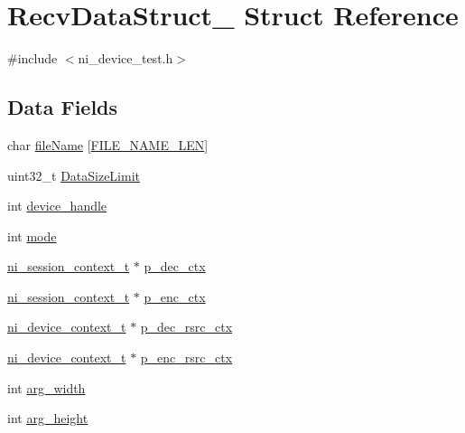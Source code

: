 \hypertarget{struct_recv_data_struct__}{}\section{Recv\+Data\+Struct\+\_\+ Struct Reference}
\label{struct_recv_data_struct__}


{\ttfamily \#include $<$ni\+\_\+device\+\_\+test.\+h$>$}

\subsection*{Data Fields}
\begin{DoxyCompactItemize}
\item 
char \mbox{\hyperlink{struct_recv_data_struct___a1d89f9668c6a633415048f1557a27122}{file\+Name}} \mbox{[}\mbox{\hyperlink{ni__device__test_8h_afddfc0468a0fb0d80c116b5e16b9be17}{F\+I\+L\+E\+\_\+\+N\+A\+M\+E\+\_\+\+L\+EN}}\mbox{]}
\item 
uint32\+\_\+t \mbox{\hyperlink{struct_recv_data_struct___a4aa53b9be31c92ae0c808987161f96d3}{Data\+Size\+Limit}}
\item 
int \mbox{\hyperlink{struct_recv_data_struct___a9f7ec948aaf8e58f5662ee0a5d9072c2}{device\+\_\+handle}}
\item 
int \mbox{\hyperlink{struct_recv_data_struct___a1ea5d0cb93f22f7d0fdf804bd68c3326}{mode}}
\item 
\mbox{\hyperlink{ni__device__api_8h_a9fdb59b68eed0a6ee64b44827cbb729d}{ni\+\_\+session\+\_\+context\+\_\+t}} $\ast$ \mbox{\hyperlink{struct_recv_data_struct___aa876a317f0d32be2ff820fffcb6994a1}{p\+\_\+dec\+\_\+ctx}}
\item 
\mbox{\hyperlink{ni__device__api_8h_a9fdb59b68eed0a6ee64b44827cbb729d}{ni\+\_\+session\+\_\+context\+\_\+t}} $\ast$ \mbox{\hyperlink{struct_recv_data_struct___a0dcef0baa36ca3470b4c561444d1b68c}{p\+\_\+enc\+\_\+ctx}}
\item 
\mbox{\hyperlink{ni__rsrc__api_8h_a880a361e6e867b45d102656e813a046f}{ni\+\_\+device\+\_\+context\+\_\+t}} $\ast$ \mbox{\hyperlink{struct_recv_data_struct___aa1910cac8a0d830cdefe42be0f679340}{p\+\_\+dec\+\_\+rsrc\+\_\+ctx}}
\item 
\mbox{\hyperlink{ni__rsrc__api_8h_a880a361e6e867b45d102656e813a046f}{ni\+\_\+device\+\_\+context\+\_\+t}} $\ast$ \mbox{\hyperlink{struct_recv_data_struct___a09d92e4609148acb4d096280e071c557}{p\+\_\+enc\+\_\+rsrc\+\_\+ctx}}
\item 
int \mbox{\hyperlink{struct_recv_data_struct___aecc7f5c68a0c2772c369ca1e574a5af0}{arg\+\_\+width}}
\item 
int \mbox{\hyperlink{struct_recv_data_struct___ae91e67d3ca1ac1094294c59a78135739}{arg\+\_\+height}}
\end{DoxyCompactItemize}


